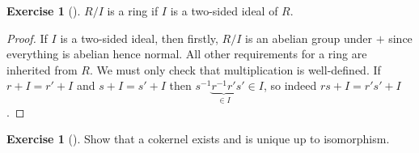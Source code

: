 \documentclass[reqno]{amsart}
\theoremstyle{definition}
\newtheorem{exercise}[theorem]{Exercise}
\theoremstyle{remark}
\begin{document}
    
    \begin{exercise}[]
        $R /I$ is a ring if $I$ is a two-sided ideal of
        $R$.
    \end{exercise}

    \begin{proof}
        If $I$ is a two-sided ideal, then firstly,
        $R /I$ is an abelian group under $+$ since
        everything is abelian hence normal. 
        All other requirements for a ring are inherited from
        $R$. We must only check that multiplication is well-defined.
        If $r + I = r'+I$ and $s + I = s' + I$ then
        $s^{-1} \underbrace{r^{-1} r'}_{\in I} s'
        \in I$, so indeed
        $rs+ I = r's' + I$.
    \end{proof}


    \begin{exercise}[]
        Show that a cokernel exists and is unique up
        to isomorphism.
    \end{exercise}
\end{document}
